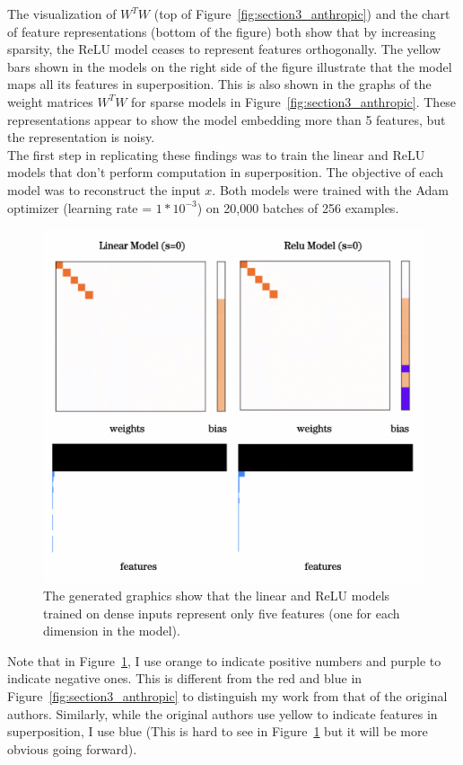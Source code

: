 \documentclass{article} %
\begin{document}
The visualization of $W^{T}W$ (top of Figure~\ref{fig:section3_anthropic}) and the 
chart of feature representations (bottom of the figure) both show that by increasing sparsity, the 
ReLU model ceases to represent features orthogonally. The yellow bars shown in the models
on the right side of the figure illustrate that the model maps all its features 
in superposition. This is also shown in the graphs of the weight matrices $W^{T}W$ for
sparse models in Figure~\ref{fig:section3_anthropic}. These 
representations appear to show the model embedding more than 5 features, but 
the representation is noisy.\\ 

The first step in replicating these findings was to train the linear and ReLU
models that don't perform computation in superposition. The
objective of each model was to reconstruct the input $x$. Both 
models were trained with the Adam optimizer (learning rate = $1*10^{-3}$) on 
20,000 batches of 256 examples.

\begin{figure}[h]
    \centering
    \includegraphics[width=0.4\linewidth]{demonstrating_superposition/images/relu_linear_0_sparsity.png}
    \captionsetup{font=footnotesize, width=0.7\linewidth} %
    \caption{The generated graphics show that the linear and ReLU models trained on
    dense inputs represent only five features (one for each dimension in the model).}
    \label{fig:relu_linear_0}
\end{figure}

Note that in Figure~\ref{fig:relu_linear_0}, I use orange to indicate
positive numbers and purple to indicate negative ones. This is different from
the red and blue in Figure~\ref{fig:section3_anthropic} to distinguish my work 
from that of the original authors. Similarly, while the original authors use 
yellow to indicate features in superposition, I use blue (This is hard to see in 
Figure~\ref{fig:relu_linear_0} but it will be more obvious going forward).
\end{document}
